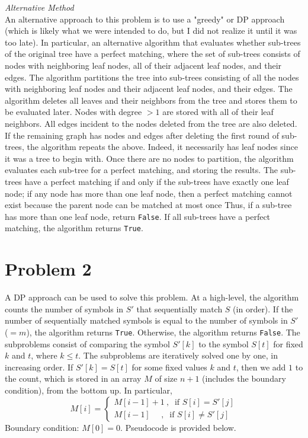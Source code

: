 \documentclass[twoside,11pt]{homework}
\begin{document}
\noindent
\textit{Alternative Method} \\
An alternative approach to this problem is to use a "greedy" or DP approach (which is likely what we were intended to do, but I did not realize it until it was too late).  In particular,  an alternative algorithm that evaluates whether sub-trees of the original tree have a perfect matching,  where the set of sub-trees consists of nodes with neighboring leaf nodes, all of their adjacent leaf nodes, and their edges.  The algorithm partitions the tree into sub-trees consisting of all the nodes with neighboring leaf nodes and their adjacent leaf nodes, and their edges.  The algorithm deletes all leaves and their neighbors from the tree and stores them to be evaluated later.  Nodes with degree $> 1$ are stored with all of their leaf neighbors.  All edges incident to the nodes deleted from the tree are also deleted.  If the remaining graph has nodes and edges after deleting the first round of sub-trees,  the algorithm repeats the above.  Indeed, it necessarily has leaf nodes since it was a tree to begin with.  Once there are no nodes to partition, the algorithm evaluates each sub-tree for a perfect matching,  and storing the results.  The sub-trees have a perfect matching if and only if the sub-trees have exactly one leaf node; if any node has more than one leaf node, then a perfect matching cannot exist because the parent node can be matched at most once  Thus, if a sub-tree has more than one leaf node, return \texttt{False}.  If all sub-trees have a perfect matching,  the algorithm returns \texttt{True}.


\section*{Problem 2}
A DP approach can be used to solve this problem.  At a high-level,  the algorithm counts the number of symbols in $S'$ that sequentially match $S$ (in order).  If the number of sequentially matched symbols is equal to the number of symbols in $S'$ ($=m$), the algorithm returns \texttt{True}. Otherwise, the algorithm returns \texttt{False}.  The subproblems consist of comparing the symbol $S'[k]$ to the symbol $S[t]$ for fixed $k$ and $t$,  where $k \leq t$.  The subproblems are iteratively solved one by one,  in increasing order.  If $S'[k] = S[t]$ for some fixed values $k$ and $t$, then we add $1$ to the count, which is stored in an array $M$ of size $n+1$ (includes the boundary condition),  from the bottom up.  In particular, 
$$M[i] = 
\begin{cases}
M[i-1] + 1 \ ,  \ \textrm{ if }  S[i] = S'[j] \\
M[i-1] \ \ \ \ \ \ ,  \ \textrm{ if }  S[i] \neq S'[j]
\end{cases}
$$
Boundary condition:  $M[0] = 0$.  Pseudocode is provided below.
\end{document}
